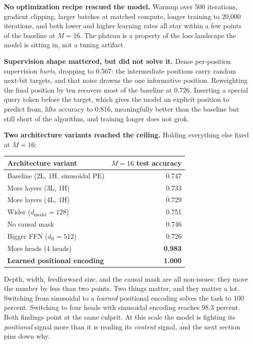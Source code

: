\textbf{No optimization recipe rescued the model.} Warmup over 500 iterations,
gradient clipping, larger batches at matched compute, longer training to
20{,}000 iterations, and both lower and higher learning rates all stay within
a few points of the baseline at $M=16$. The plateau is a property of the loss
landscape the model is sitting in, not a tuning artifact.

\textbf{Supervision shape mattered, but did not solve it.} Dense
per-position supervision \emph{hurts}, dropping to 0.567: the intermediate
positions carry random next-bit targets, and that noise drowns the one
informative position. Reweighting the final position by ten recovers most of
the baseline at 0.726. Inserting a special query token before the target,
which gives the model an explicit position to predict from, lifts accuracy to
0.816, meaningfully better than the baseline but still short of the algorithm,
and training longer does not grok.

\textbf{Two architecture variants reached the ceiling.} Holding everything
else fixed at $M=16$:

\begin{center}
\begin{tabular}{@{}lr@{}}
\toprule
Architecture variant & $M=16$ test accuracy \\
\midrule
Baseline (2L, 1H, sinusoidal PE) & 0.747 \\
More layers (3L, 1H)             & 0.733 \\
More layers (4L, 1H)             & 0.729 \\
Wider ($d_{\text{model}} = 128$) & 0.751 \\
No causal mask                   & 0.746 \\
Bigger FFN ($d_{\text{ff}} = 512$) & 0.726 \\
More heads (4 heads)             & \textbf{0.983} \\
\textbf{Learned positional encoding} & \textbf{1.000} \\
\bottomrule
\end{tabular}
\end{center}

Depth, width, feedforward size, and the causal mask are all non-issues: they
move the number by less than two points. Two things matter, and they matter a
lot. Switching from sinusoidal to a \emph{learned} positional encoding solves
the task to 100 percent. Switching to four heads with sinusoidal encoding
reaches 98.3 percent. Both findings point at the same culprit. At this scale
the model is fighting its \emph{positional} signal more than it is reading its
\emph{content} signal, and the next section pins down why.
